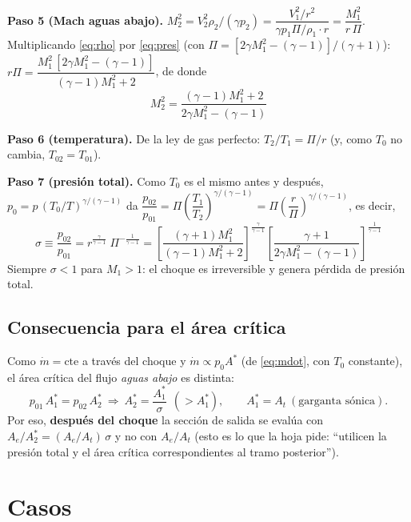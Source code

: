 \documentclass[11pt,a4paper]{article}
\newcommand{\ie}{es decir,\ }
\begin{document}
\textbf{Paso 5 (Mach aguas abajo).} $M_2^2=V_2^2\rho_2/(\gamma p_2)=\dfrac{V_1^2/r^2}{\gamma p_1\Pi/\rho_1\cdot r}=\dfrac{M_1^2}{r\,\Pi}$. Multiplicando \eqref{eq:rho}
por \eqref{eq:pres} (con $\Pi=[2\gamma M_1^2-(\gamma-1)]/(\gamma+1)$):
$r\Pi=\dfrac{M_1^2\,[2\gamma M_1^2-(\gamma-1)]}{(\gamma-1)M_1^2+2}$, de donde
\begin{equation}
\boxed{M_2^2=\frac{(\gamma-1)M_1^2+2}{2\gamma M_1^2-(\gamma-1)}}\label{eq:M2}
\end{equation}

\textbf{Paso 6 (temperatura).} De la ley de gas perfecto: $T_2/T_1=\Pi/r$ (y, como $T_0$ no cambia, $T_{02}=T_{01}$).

\textbf{Paso 7 (presión total).} Como $T_0$ es el mismo antes y después, $p_0=p\,(T_0/T)^{\gamma/(\gamma-1)}$ da
$\dfrac{p_{02}}{p_{01}}=\Pi\left(\dfrac{T_1}{T_2}\right)^{\gamma/(\gamma-1)}=\Pi\left(\dfrac r\Pi\right)^{\gamma/(\gamma-1)}$, \ie
\begin{equation}
\boxed{\sigma\equiv\frac{p_{02}}{p_{01}}=r^{\frac{\gamma}{\gamma-1}}\;\Pi^{-\frac{1}{\gamma-1}}
=\left[\frac{(\gamma+1)M_1^2}{(\gamma-1)M_1^2+2}\right]^{\frac{\gamma}{\gamma-1}}\left[\frac{\gamma+1}{2\gamma M_1^2-(\gamma-1)}\right]^{\frac{1}{\gamma-1}}}\label{eq:sigma}
\end{equation}
Siempre $\sigma<1$ para $M_1>1$: el choque es irreversible y genera pérdida de presión total.

\subsection{Consecuencia para el área crítica}
Como $\dot m=\text{cte}$ a través del choque y $\dot m\propto p_0A^*$ (de \eqref{eq:mdot}, con $T_0$ constante), el área crítica
del flujo \emph{aguas abajo} es distinta:
\begin{equation}
p_{01}\,A^*_1=p_{02}\,A^*_2\ \Longrightarrow\ \boxed{A^*_2=\frac{A^*_1}{\sigma}}\ \ (>A^*_1),\qquad A^*_1=A_t\ (\text{garganta sónica}).
\label{eq:Astar2}
\end{equation}
Por eso, \textbf{después del choque} la sección de salida se evalúa con $A_e/A^*_2=(A_e/A_t)\,\sigma$ y no con $A_e/A_t$
(esto es lo que la hoja pide: ``utilicen la presión total y el área crítica correspondientes al tramo posterior'').

\section{Casos}
\end{document}
